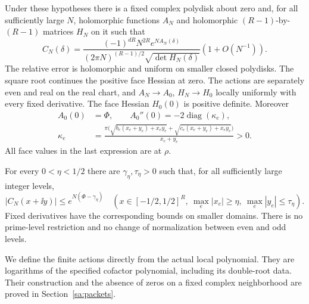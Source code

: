 \begin{theorem}\label{sa:main}
Under these hypotheses there is a fixed complex polydisk about zero
and, for all sufficiently large $N$, holomorphic functions $A_N$ and
holomorphic $(R-1)$-by-$(R-1)$ matrices $H_N$ on it such that
\begin{equation}\label{sa:H1}
 C_N(\delta)=
 \frac{(-1)^{dR}N^{2R}e^{NA_N(\delta)}}
 {(2\pi N)^{(R-1)/2}\sqrt{\det H_N(\delta)}}
                         (1+O(N^{-1})).
\end{equation}
The relative error is holomorphic and uniform on smaller closed
polydisks. The square root continues the positive face Hessian at zero.
The actions are separately even and real on the real chart, and
$A_N\to A_0$, $H_N\to H_0$ locally uniformly with every fixed derivative.
The face Hessian $H_0(0)$ is positive definite. Moreover
\begin{equation}\label{sa:hessian}
 \begin{aligned}
 A_0(0)&=\Phi,\qquad A_0''(0)=-2\operatorname{diag}(\kappa_e),\\
 \kappa_e&=\frac{\pi\bigl(\sqrt{b_e(x_e+y_e)+x_ey_e}
                    +\sqrt{c_e(x_e+y_e)+x_ey_e}\bigr)}
                    {x_e+y_e}>0.
 \end{aligned}
\end{equation}
All face values in the last expression are at $\rho$.

For every $0<\eta<1/2$ there are $\gamma_\eta,\tau_\eta>0$ such that,
for all sufficiently large integer levels,
\begin{equation}\label{sa:H2}
 |C_N(x+\ii y)|\le e^{N(\Phi-\gamma_\eta)}
 \quad(x\in[-1/2,1/2]^R,\ \max_e|x_e|\ge\eta,
                       \ \max_e|y_e|\le\tau_\eta).
\end{equation}
Fixed derivatives have the corresponding bounds on smaller domains.
There is no prime-level restriction and no change of normalization
between even and odd levels.
\end{theorem}

We define the finite actions directly from the actual local polynomial.
They are logarithms of the specified cofactor polynomial, including
its double-root data. Their construction and the absence of zeros
on a fixed complex neighborhood are proved in Section~\ref{sa:packets}.

